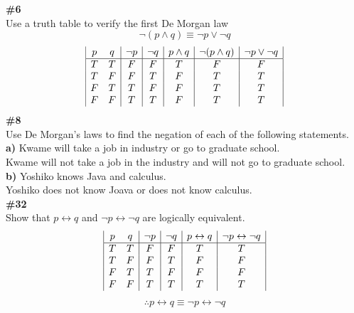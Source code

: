 \documentclass{article}
\newcommand{\problem}[1]{\textbf{\##1}}
\newcommand{\prob}[1]{\problem{#1}}
\begin{document}
\problem{6}\\
Use a truth table to verify the first De Morgan law
\begin{displaymath}
    \neg(p \wedge q) \equiv \neg p \vee \neg q
\end{displaymath}
\begin{displaymath}
    \begin{array}{|c c|c|c|c|c|c|}

    p & q & \neg p & \neg q & p \wedge q & \neg(p \wedge q) & \neg p \vee \neg q \\
    \hline
    T & T & F      & F      & T          & F                & F                  \\
    T & F & F      & T      & F          & T                & T                  \\
    F & T & T      & F      & F          & T                & T                  \\
    F & F & T      & T      & F          & T                & T                  \\
    \end{array}
\end{displaymath}
\problem{8}\\
Use De Morgan’s laws to find the negation of each of the
following statements.\\
\textbf{a)}
Kwame will take a job in industry or go to graduate school. \\
Kwame will not take a job in the industry and will not go to graduate school.\\
\textbf{b)}
Yoshiko knows Java and calculus.\\
Yoshiko does not know Joava or does not know calculus.\\
\prob{32}\\
Show that \(p \leftrightarrow q\) and \(\neg p \leftrightarrow \neg q\) are logically equivalent.
\begin{displaymath}
    \begin{array}{|c c|c|c|c|c|c|}

    p & q & \neg p & \neg q & p \leftrightarrow q & \neg p \leftrightarrow \neg q \\
    \hline
    T & T & F      & F      & T                   & T                             \\
    T & F & F      & T      & F                   & F                             \\
    F & T & T      & F      & F                   & F                             \\
    F & F & T      & T      & T                   & T                             \\
    \end{array}
\end{displaymath}
\begin{align*}
    \therefore p \leftrightarrow q \equiv \neg p \leftrightarrow \neg q
\end{align*}

\pagebreak
\end{document}

